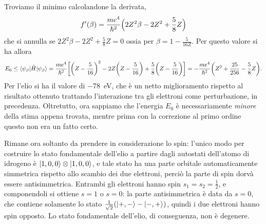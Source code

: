 Troviamo il minimo calcolandone la derivata,
\begin{equation}
    f'(\beta)=\frac{me^4}{\hbar^2}\Bigl(2Z^2\beta-2Z^2+\frac58Z\Bigr)
\end{equation}
che si annulla se $2Z^2\beta-2Z^2+\frac58Z=0$ ossia per $\beta=1-\frac5{16Z}$.
Per questo valore si ha allora
\begin{equation}
    E_0\le
    \langle\psi_\beta\rvert\hat{H}\lvert\psi_\beta\rangle=
    \frac{me^4}{\hbar^2}\biggl[\bigg(Z-\frac5{16}\bigg)^2-2Z\biggl(Z-\frac5{16}\biggr)+\frac58\bigg(Z-\frac5{16}\biggr)\biggr]=
    -\frac{me^4}{\hbar^2}\biggl(Z^2+\frac{25}{256}-\frac58Z\biggr).
\end{equation}
Per l'elio si ha il valore di \SI{-78}{\electronvolt}, che è un netto miglioramento rispetto al risultato ottenuto trattando l'interazione tra gli elettroni come perturbazione, in precedenza.
Oltretutto, ora sappiamo che l'energia $E_0$ è necessariamente \emph{minore} della stima appena trovata, mentre prima con la correzione al primo ordine questo non era un fatto certo.

Rimane ora soltanto da prendere in considerazione lo spin: l'unico modo per costruire lo stato fondamentale dell'elio a partire dagli autostati dell'atomo di idrogeno è $\lvert1,0,0\rangle\otimes\lvert1,0,0\rangle$, e tale stato ha una parte orbitale automaticamente simmetrica rispetto allo scambio dei due elettroni, perciò la parte di spin dorvà essere antisimmetrica.
Entrambi gli elettroni hanno spin $s_1=s_2=\frac12$, e componendoli si ottiene $s=1$ o $s=0$: la parte antisimmetrica è data da $s=0$, che contiene solamente lo stato $\frac1{\sqrt{2}}(\lvert+,-\rangle-\lvert-,+\rangle)$, quindi i due elettroni hanno spin opposto.
Lo stato fondamentale dell'elio, di conseguenza, non è degenere.

